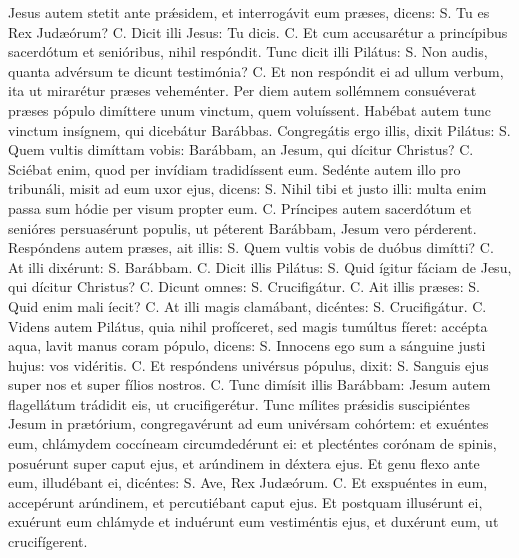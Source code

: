 \begin{paracol}{2}
{Jesus autem stetit ante prǽsidem, et interrogávit eum præses, dicens: {\redx S.} Tu es Rex Judæórum? {\redx C.} Dicit illi Jesus: \cruz Tu dicis. {\redx C.} Et cum accusarétur a princípibus sacerdótum et senióribus, nihil respóndit. Tunc dicit illi Pilátus: {\redx S.} Non audis, quanta advérsum te dicunt testimónia? {\redx C.} Et non respóndit ei ad ullum verbum, ita ut mirarétur præses veheménter. Per diem autem sollémnem consuéverat præses pópulo dimíttere unum vinctum, quem voluíssent. Habébat autem tunc vinctum insígnem, qui dicebátur Barábbas. Congregátis ergo illis, dixit Pilátus: {\redx S.} Quem vultis dimíttam vobis: Barábbam, an Jesum, qui dícitur Christus? {\redx C.} Sciébat enim, quod per invídiam tradidíssent eum. Sedénte autem illo pro tribunáli, misit ad eum uxor ejus, dicens: {\redx S.} Nihil tibi et justo illi: multa enim passa sum hódie per visum propter eum. {\redx C.} Príncipes autem sacerdótum et senióres persuasérunt populis, ut péterent Barábbam, Jesum vero pérderent. Respóndens autem præses, ait illis: {\redx S.} Quem vultis vobis de duóbus dimítti? {\redx C.} At illi dixérunt: {\redx S.} Barábbam. {\redx C.} Dicit illis Pilátus: {\redx S.} Quid ígitur fáciam de Jesu, qui dícitur Christus? {\redx C.} Dicunt omnes: {\redx S.} Crucifigátur. {\redx C.} Ait illis præses: {\redx S.} Quid enim mali íecit? {\redx C.} At illi magis clamábant, dicéntes: {\redx S.} Crucifigátur. {\redx C.} Videns autem Pilátus, quia nihil profíceret, sed magis tumúltus fíeret: accépta aqua, lavit manus coram pópulo, dicens: {\redx S.} Innocens ego sum a sánguine justi hujus: vos vidéritis. {\redx C.} Et respóndens univérsus pópulus, dixit: {\redx S.} Sanguis ejus super nos et super fílios nostros. {\redx C.} Tunc dimísit illis Barábbam: Jesum autem flagellátum trádidit eis, ut crucifigerétur. Tunc mílites prǽsidis suscipiéntes Jesum in prætórium, congregavérunt ad eum univérsam cohórtem: et exuéntes eum, chlámydem coccíneam circumdedérunt ei: et plecténtes corónam de spinis, posuérunt super caput ejus, et arúndinem in déxtera ejus. Et genu flexo ante eum, illudébant ei, dicéntes: {\redx S.} Ave, Rex Judæórum. {\redx C.} Et exspuéntes in eum, accepérunt arúndinem, et percutiébant caput ejus. Et postquam illusérunt ei, exuérunt eum chlámyde et induérunt eum vestiméntis ejus, et duxérunt eum, ut crucifígerent.
}\switchcolumn\portugues{
}
\end{paracol}
